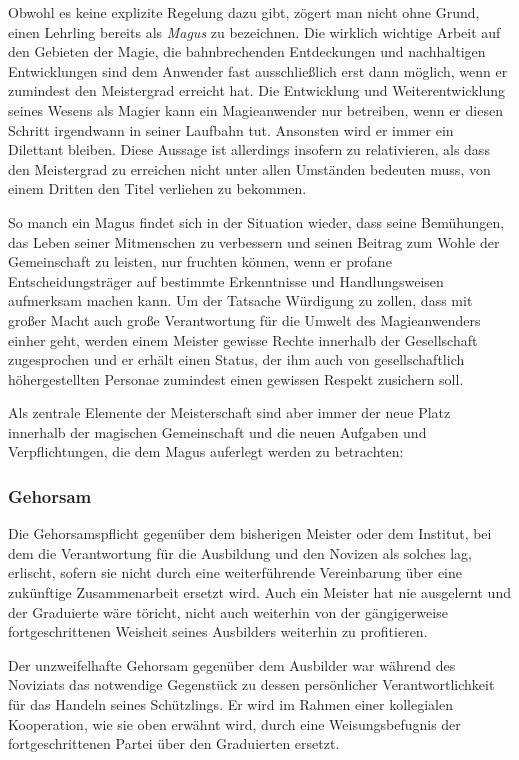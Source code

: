 \documentclass[a5paper,8pt]{book}
\begin{document}
Obwohl es keine explizite Regelung dazu gibt, zögert man nicht ohne Grund, einen
Lehrling bereits als \textit{Magus} zu bezeichnen. Die wirklich wichtige Arbeit auf
den Gebieten der Magie, die bahnbrechenden Entdeckungen und nachhaltigen
Entwicklungen sind dem Anwender fast ausschließlich erst dann möglich, wenn er
zumindest den Meistergrad erreicht hat. Die Entwicklung und Weiterentwicklung
seines Wesens als Magier kann ein Magieanwender nur betreiben, wenn er diesen
Schritt irgendwann in seiner Laufbahn tut. Ansonsten wird er immer ein Dilettant
bleiben. Diese Aussage ist allerdings insofern zu relativieren, als dass den
Meistergrad zu erreichen nicht unter allen Umständen bedeuten muss, von einem
Dritten den Titel verliehen zu bekommen.

So manch ein Magus findet sich in der Situation wieder, dass seine Bemühungen,
das Leben seiner Mitmenschen zu verbessern und seinen Beitrag zum Wohle der
Gemeinschaft zu leisten, nur fruchten können, wenn er profane
Entscheidungsträger auf bestimmte Erkenntnisse und Handlungsweisen aufmerksam
machen kann. Um der Tatsache Würdigung zu zollen, dass mit großer Macht auch
große Verantwortung für die Umwelt des Magieanwenders einher geht, werden einem
Meister gewisse Rechte innerhalb der Gesellschaft zugesprochen und er erhält
einen Status, der ihm auch von gesellschaftlich höhergestellten Personae
zumindest einen gewissen Respekt zusichern soll.

Als zentrale Elemente der Meisterschaft sind aber immer der neue Platz innerhalb
der magischen Gemeinschaft und die neuen Aufgaben und Verpflichtungen, die dem
Magus auferlegt werden zu betrachten:

\subsubsection*{Gehorsam}
Die Gehorsamspflicht gegenüber dem bisherigen Meister oder dem Institut, bei
dem die Verantwortung für die Ausbildung und den Novizen als solches lag,
erlischt, sofern sie nicht durch eine weiterführende Vereinbarung über eine
zukünftige Zusammenarbeit ersetzt wird.
Auch ein Meister hat nie ausgelernt und der Graduierte wäre töricht, nicht auch
weiterhin von der gängigerweise fortgeschrittenen Weisheit seines Ausbilders
weiterhin zu profitieren. 

Der unzweifelhafte Gehorsam gegenüber dem Ausbilder war während des Noviziats
das notwendige Gegenstück zu dessen persönlicher Verantwortlichkeit für das
Handeln seines Schützlings. Er wird im Rahmen einer kollegialen Kooperation, wie
sie oben erwähnt wird, durch eine Weisungsbefugnis der fortgeschrittenen Partei
über den Graduierten ersetzt.
\end{document}
